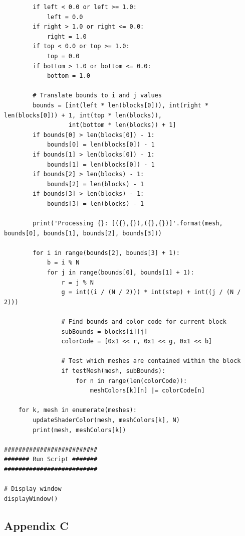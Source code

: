 \documentclass[conference]{IEEEtran}
\begin{document}
{{\begin{verbatim}
        if left < 0.0 or left >= 1.0:
            left = 0.0
        if right > 1.0 or right <= 0.0:
            right = 1.0
        if top < 0.0 or top >= 1.0:
            top = 0.0
        if bottom > 1.0 or bottom <= 0.0:
            bottom = 1.0
        
        # Translate bounds to i and j values
        bounds = [int(left * len(blocks[0])), int(right * len(blocks[0])) + 1, int(top * len(blocks)),
                  int(bottom * len(blocks)) + 1]
        if bounds[0] > len(blocks[0]) - 1:
            bounds[0] = len(blocks[0]) - 1
        if bounds[1] > len(blocks[0]) - 1:
            bounds[1] = len(blocks[0]) - 1
        if bounds[2] > len(blocks) - 1:
            bounds[2] = len(blocks) - 1
        if bounds[3] > len(blocks) - 1:
            bounds[3] = len(blocks) - 1
        
        print('Processing {}: [({},{}),({},{})]'.format(mesh, bounds[0], bounds[1], bounds[2], bounds[3]))
        
        for i in range(bounds[2], bounds[3] + 1):
            b = i % N
            for j in range(bounds[0], bounds[1] + 1):
                r = j % N
                g = int((i / (N / 2))) * int(step) + int((j / (N / 2)))
                
                # Find bounds and color code for current block
                subBounds = blocks[i][j]
                colorCode = [0x1 << r, 0x1 << g, 0x1 << b]
                
                # Test which meshes are contained within the block
                if testMesh(mesh, subBounds):
                    for n in range(len(colorCode)):
                        meshColors[k][n] |= colorCode[n]

    for k, mesh in enumerate(meshes):
        updateShaderColor(mesh, meshColors[k], N)
        print(mesh, meshColors[k])
    
##########################
####### Run Script #######
##########################

# Display window
displayWindow()
\end{verbatim}

\pagebreak

\begin{center}
\section*{Appendix C}
\label{app:b}
\end{center}

}}
\end{document}

